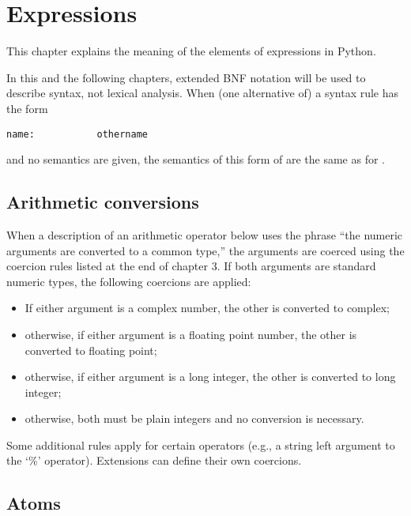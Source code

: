 \chapter{Expressions\label{expressions}}

This chapter explains the meaning of the elements of expressions in
Python.

 In this and the following chapters, extended
BNF notation will be used to describe syntax, not lexical
analysis.  When (one alternative of) a syntax rule has the form

\begin{verbatim}
name:           othername
\end{verbatim}

and no semantics are given, the semantics of this form of 
are the same as for .

\section{Arithmetic conversions\label{conversions}}

When a description of an arithmetic operator below uses the phrase
``the numeric arguments are converted to a common type,'' the
arguments are coerced using the coercion rules listed at the end of
chapter 3.  If both arguments are standard numeric types, the
following coercions are applied:

\begin{itemize}
\item	If either argument is a complex number, the other is converted
	to complex;
\item	otherwise, if either argument is a floating point number,
	the other is converted to floating point;
\item	otherwise, if either argument is a long integer,
	the other is converted to long integer;
\item	otherwise, both must be plain integers and no conversion
	is necessary.
\end{itemize}

Some additional rules apply for certain operators (e.g., a string left
argument to the `\%' operator). Extensions can define their own
coercions.


\section{Atoms\label{atoms}}

